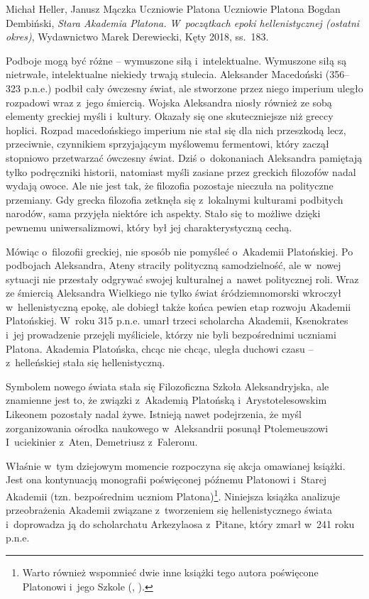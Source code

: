 \begin{recplenv}{Michał Heller, Janusz Mączka}
	{Uczniowie Platona}
	{Uczniowie Platona}
	{Bogdan Dembiński, \textit{Stara Akademia Platona. W~początkach epoki hellenistycznej
			(ostatni okres)}, Wydawnictwo Marek Derewiecki, Kęty 2018, ss.~183.}


Podboje mogą być różne -- wymuszone siłą i~intelektualne. Wymuszone siłą są
nietrwałe, intelektualne niekiedy trwają stulecia. Aleksander Macedoński (356--323 p.n.e.) podbił cały ówczesny świat,
ale stworzone przez niego imperium uległo rozpadowi wraz z~jego śmiercią. Wojska Aleksandra niosły również ze sobą
elementy greckiej myśli i~kultury. Okazały się one skuteczniejsze niż greccy hoplici. Rozpad macedońskiego imperium nie
stał się dla nich przeszkodą lecz, przeciwnie, czynnikiem sprzyjającym myślowemu fermentowi, który zaczął stopniowo
przetwarzać ówczesny świat. Dziś o~dokonaniach Aleksandra pamiętają tylko podręczniki historii, natomiast myśli zasiane
przez greckich filozofów nadal wydają owoce. Ale nie jest tak, że filozofia pozostaje nieczuła na polityczne przemiany.
Gdy grecka filozofia zetknęła się z~lokalnymi kulturami podbitych narodów, sama przyjęła niektóre ich aspekty. Stało
się to możliwe dzięki pewnemu uniwersalizmowi, który był jej charakterystyczną cechą.


Mówiąc o~filozofii greckiej, nie sposób nie pomyśleć o~Akademii Platońskiej. Po
podbojach Aleksandra, Ateny straciły polityczną samodzielność, ale w~nowej sytuacji nie przestały odgrywać swojej
kulturalnej a~nawet politycznej roli. Wraz ze śmiercią Aleksandra Wielkiego nie tylko świat śródziemnomorski wkroczył
 w~hellenistyczną epokę, ale dobiegł także końca pewien etap rozwoju Akademii Platońskiej. W~roku 315 p.n.e. umarł trzeci
scholarcha Akademii, Ksenokrates i~jej prowadzenie przejęli myśliciele, którzy nie byli bezpośrednimi uczniami Platona.
Akademia Platońska, chcąc nie chcąc, uległa duchowi czasu -- z~helleńskiej stała się hellenistyczną.


Symbolem nowego świata stała się Filozoficzna Szkoła Aleksandryjska, ale znamienne
jest to, że związki z~Akademią Platońską i~Arystotelesowskim Likeonem pozostały nadal żywe. Istnieją nawet podejrzenia,
że myśl zorganizowania ośrodka naukowego w~Aleksandrii posunął Ptolemeuszowi I~uciekinier z~Aten, Demetriusz
 z~Faleronu.


Właśnie w~tym dziejowym momencie rozpoczyna się akcja omawianej książki. Jest ona
kontynuacją monografii \parencite{dembinski_pozny_2010} poświęconej późnemu Platonowi i~Starej
Akademii (tzn. bezpośrednim uczniom
Platona)\footnote{Warto również wspomnieć dwie inne książki tego autora poświęcone
Platonowi i~jego Szkole (\cite{dembinski_teoria_1997}, \cite*{dembinski_pozna_2003}).}. Niniejsza książka analizuje przeobrażenia
Akademii związane z~tworzeniem się hellenistycznego świata i~doprowadza ją do scholarchatu Arkezylaosa z~Pitane, który
zmarł w~241 roku p.n.e.



\end{recplenv}

